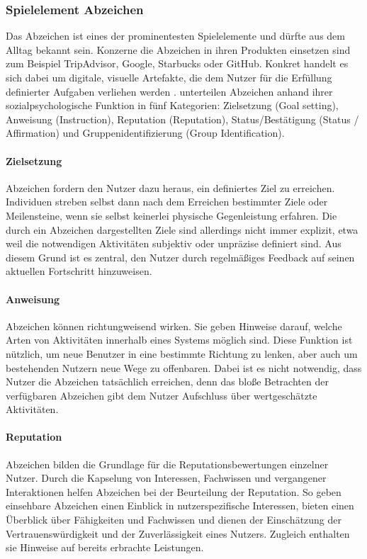 \subsubsection{Spielelement Abzeichen}\label{badge}
Das Abzeichen ist eines der prominentesten Spielelemente und dürfte aus dem Alltag bekannt sein. Konzerne die Abzeichen in ihren Produkten einsetzen sind zum Beispiel TripAdvisor, Google, Starbucks oder GitHub. Konkret handelt es sich dabei um digitale, visuelle Artefakte, die dem Nutzer für die Erfüllung definierter Aufgaben verliehen werden \cite{antin_badges_2011}.  unterteilen Abzeichen anhand ihrer sozialpsychologische Funktion in fünf Kategorien: Zielsetzung (Goal setting), Anweisung (Instruction), Reputation (Reputation),
Status/Bestätigung (Status / Affirmation) und Gruppenidentifizierung (Group Identification). 


\paragraph{Zielsetzung}
Abzeichen fordern den Nutzer dazu heraus, ein definiertes Ziel zu erreichen. Individuen streben selbst dann nach dem Erreichen bestimmter Ziele oder Meilensteine, wenn sie selbst keinerlei physische Gegenleistung erfahren. Die durch ein Abzeichen dargestellten Ziele sind allerdings nicht immer explizit, etwa weil die notwendigen Aktivitäten subjektiv oder unpräzise definiert sind. Aus diesem Grund ist es zentral, den Nutzer durch regelmäßiges Feedback auf seinen aktuellen Fortschritt hinzuweisen. 

\paragraph{Anweisung}
Abzeichen können richtungweisend wirken. Sie geben Hinweise darauf, welche Arten von Aktivitäten innerhalb eines Systems möglich sind. Diese Funktion ist nützlich, um neue Benutzer in eine bestimmte Richtung zu lenken, aber auch um bestehenden Nutzern neue Wege zu offenbaren. Dabei ist es nicht notwendig, dass Nutzer die Abzeichen tatsächlich erreichen, denn das bloße Betrachten der verfügbaren Abzeichen gibt dem Nutzer Aufschluss über wertgeschätzte Aktivitäten.

\paragraph{Reputation}
Abzeichen bilden die Grundlage für die Reputationsbewertungen einzelner Nutzer. Durch die Kapselung von Interessen, Fachwissen und vergangener Interaktionen helfen Abzeichen bei der Beurteilung der Reputation. So geben einsehbare Abzeichen einen Einblick in nutzerspezifische Interessen, bieten einen Überblick über Fähigkeiten und Fachwissen und dienen der Einschätzung der Vertrauenswürdigkeit und der Zuverlässigkeit eines Nutzers. Zugleich enthalten sie Hinweise auf bereits erbrachte Leistungen.

